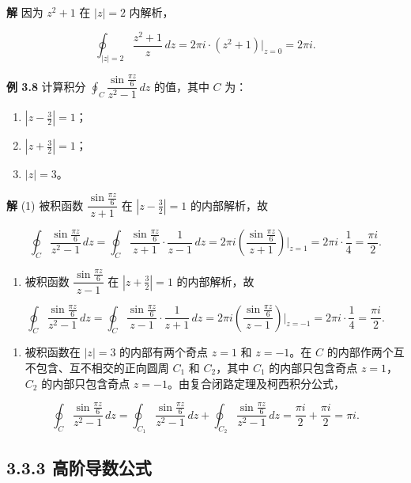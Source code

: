 \textbf{解} 因为 \(z^2+1\) 在 \(|z|=2\) 内解析，

\[
\oint_{|z|=2}\frac{z^2+1}{z}\,dz
=2\pi i\cdot(z^2+1)\big|_{z=0}=2\pi i .
\]

\textbf{例 3.8} 计算积分
\(\oint_C\dfrac{\sin\frac{\pi z}{6}}{z^2-1}\,dz\) 的值，其中 \(C\) 为：

\begin{enumerate}
\def\labelenumi{\arabic{enumi}.}
\tightlist
\item
  \(|z-\frac32|=1\)；
\item
  \(|z+\frac32|=1\)；
\item
  \(|z|=3\)。
\end{enumerate}

\textbf{解} (1) 被积函数 \(\dfrac{\sin\frac{\pi z}{6}}{z+1}\) 在
\(|z-\frac32|=1\) 的内部解析，故

\[
\oint_C\frac{\sin\frac{\pi z}{6}}{z^2-1}\,dz
=\oint_C\frac{\sin\frac{\pi z}{6}}{z+1}\cdot\frac{1}{z-1}\,dz
=2\pi i\left(\frac{\sin\frac{\pi z}{6}}{z+1}\right)\Big|_{z=1}
=2\pi i\cdot\frac14=\frac{\pi i}{2}.
\]

\begin{enumerate}
\def\labelenumi{(\arabic{enumi})}
\setcounter{enumi}{1}
\tightlist
\item
  被积函数 \(\dfrac{\sin\frac{\pi z}{6}}{z-1}\) 在 \(|z+\frac32|=1\)
  的内部解析，故
\end{enumerate}

\[
\oint_C\frac{\sin\frac{\pi z}{6}}{z^2-1}\,dz
=\oint_C\frac{\sin\frac{\pi z}{6}}{z-1}\cdot\frac{1}{z+1}\,dz
=2\pi i\left(\frac{\sin\frac{\pi z}{6}}{z-1}\right)\Big|_{z=-1}
=2\pi i\cdot\frac14=\frac{\pi i}{2}.
\]

\begin{enumerate}
\def\labelenumi{(\arabic{enumi})}
\setcounter{enumi}{2}
\tightlist
\item
  被积函数在 \(|z|=3\) 的内部有两个奇点 \(z=1\) 和 \(z=-1\)。在 \(C\)
  的内部作两个互不包含、互不相交的正向圆周 \(C_1\) 和 \(C_2\)，其中
  \(C_1\) 的内部只包含奇点 \(z=1\)，\(C_2\) 的内部只包含奇点
  \(z=-1\)。由复合闭路定理及柯西积分公式，
\end{enumerate}

\[
\oint_C\frac{\sin\frac{\pi z}{6}}{z^2-1}\,dz
=\oint_{C_1}\frac{\sin\frac{\pi z}{6}}{z^2-1}\,dz+\oint_{C_2}\frac{\sin\frac{\pi z}{6}}{z^2-1}\,dz
=\frac{\pi i}{2}+\frac{\pi i}{2}=\pi i .
\]

\subsection{3.3.3
高阶导数公式}\label{ux9ad8ux9636ux5bfcux6570ux516cux5f0f}

